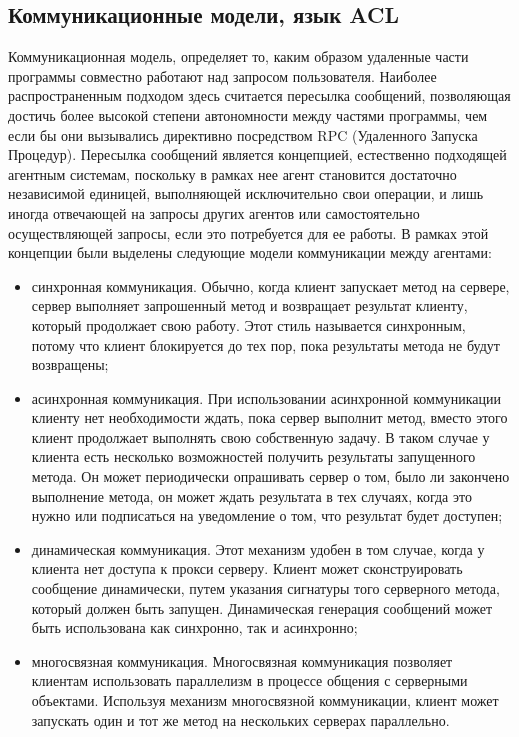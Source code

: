 \subsection{Коммуникационные модели, язык ACL}
Коммуникационная модель, определяет то, каким образом удаленные части программы совместно работают над запросом пользователя. Наиболее распространенным подходом здесь считается пересылка сообщений, позволяющая достичь более высокой степени автономности между частями программы, чем если бы они вызывались директивно посредством RPC (Удаленного Запуска Процедур). Пересылка сообщений является концепцией, естественно подходящей агентным системам, поскольку в рамках нее агент становится достаточно независимой единицей, выполняющей исключительно свои операции, и лишь иногда отвечающей на запросы других агентов или самостоятельно осуществляющей запросы, если это потребуется для ее работы. В рамках этой концепции были выделены следующие модели коммуникации между агентами:
\begin{itemize}
\item синхронная коммуникация. Обычно, когда клиент запускает метод на сервере, сервер выполняет запрошенный метод и возвращает результат клиенту, который продолжает свою работу. Этот стиль называется синхронным, потому что клиент блокируется до тех пор, пока результаты метода не будут возвращены;
\item асинхронная коммуникация. При использовании асинхронной коммуникации клиенту нет необходимости ждать, пока сервер выполнит метод, вместо этого клиент продолжает выполнять свою собственную задачу. В таком случае у клиента есть несколько возможностей получить результаты запущенного метода. Он может периодически опрашивать сервер о том, было ли закончено выполнение метода, он может ждать результата в тех случаях, когда это нужно или подписаться на уведомление о том, что результат будет доступен;
\item динамическая коммуникация. Этот механизм удобен в том случае, когда у клиента нет доступа к прокси серверу. Клиент может сконструировать сообщение динамически, путем указания сигнатуры того серверного метода, который должен быть запущен. Динамическая генерация сообщений может быть использована как синхронно, так и асинхронно;
\item многосвязная коммуникация. Многосвязная коммуникация позволяет клиентам использовать параллелизм в процессе общения с серверными объектами. Используя механизм многосвязной коммуникации, клиент может запускать один и тот же метод на нескольких серверах параллельно.
\end{itemize}

